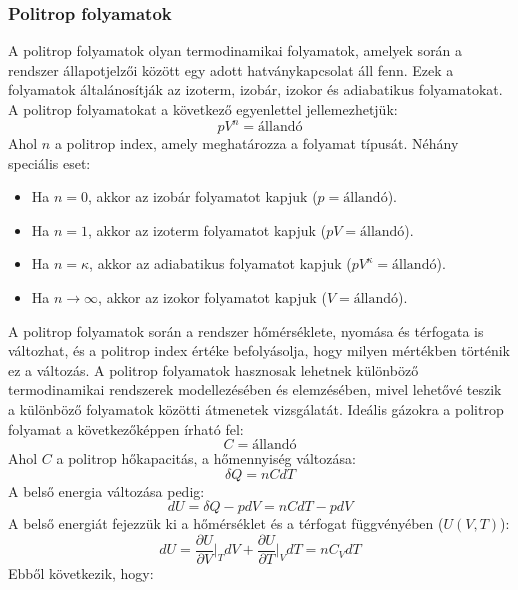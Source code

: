 \documentclass[a4paper,12pt]{article}
\begin{document}
\subsubsection{Politrop folyamatok}
A politrop folyamatok olyan termodinamikai folyamatok, amelyek során a rendszer állapotjelzői között egy adott hatványkapcsolat áll fenn. Ezek a folyamatok általánosítják az izoterm, izobár, izokor és adiabatikus folyamatokat.
A politrop folyamatokat a következő egyenlettel jellemezhetjük:
\begin{equation}
    p V^n = \text{állandó}
\end{equation}
Ahol $n$ a politrop index, amely meghatározza a folyamat típusát. Néhány speciális eset:
\begin{itemize}
    \item Ha $n = 0$, akkor az izobár folyamatot kapjuk ($p = \text{állandó}$).
    \item Ha $n = 1$, akkor az izoterm folyamatot kapjuk ($p V = \text{állandó}$).
    \item Ha $n = \kappa$, akkor az adiabatikus folyamatot kapjuk ($p V^{\kappa} = \text{állandó}$).
    \item Ha $n \to \infty$, akkor az izokor folyamatot kapjuk ($V = \text{állandó}$).
\end{itemize}
A politrop folyamatok során a rendszer hőmérséklete, nyomása és térfogata is változhat, és a politrop index értéke befolyásolja, hogy milyen mértékben történik ez a változás. A politrop folyamatok hasznosak lehetnek különböző termodinamikai rendszerek modellezésében és elemzésében, mivel lehetővé teszik a különböző folyamatok közötti átmenetek vizsgálatát.
Ideális gázokra a politrop folyamat a következőképpen írható fel:
\begin{equation}
    C = \text{állandó}
\end{equation}
Ahol $C$ a politrop hőkapacitás, a hőmennyiség változása:
\begin{equation}
    \delta Q = n C dT
\end{equation}
A belső energia változása pedig:
\begin{equation}
    dU = \delta Q - pdV = n C dT - p dV
\end{equation}
A belső energiát fejezzük ki a hőmérséklet és a térfogat függvényében ($U(V, T)$):
\begin{equation}
    dU = \frac{\partial U}{\partial V}\bigg|_{T} dV + \frac{\partial U}{\partial T}\bigg|_{V} dT = n C_V dT
\end{equation}
Ebből következik, hogy:
\end{document}
